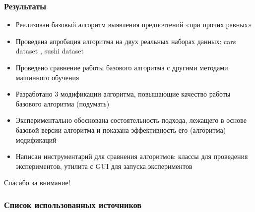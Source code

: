 \documentclass[xcolor=table]{beamer}
\theoremstyle{definition}
\begin{document}
	\begin{frame}
		\frametitle{Результаты}
		\begin{itemize}
			\item Реализован базовый алгоритм выявления предпочтений «при прочих равных»
			\item Проведена апробация алгоритма на двух реальных наборах данных: cars dataset \cite{dataset:Abbasnejad:2013}, sushi dataset \cite{Kamishima:2003} 
			\item Проведено сравнение работы базового алгоритма с другими методами машинного обучения
			\item Разработано 3 модификации алгоритма, повышающие качество работы базового алгоритма (подумать)
			\item Экспериментально обоснована состоятельность подхода, лежащего в основе базовой версии алгоритма и показана  эффективность его (алгоритма) модификаций
		\end{itemize}
		\pause
		\begin{itemize}
			\item {\color{gray} Написан инструментарий для сравнения алгоритмов: классы для проведения экспериментов, утилита с GUI для запуска экспериментов}
		\end{itemize}
	\end{frame}
		
	\begin{frame}[plain,c]
		\begin{center}
			\Huge Спасибо за внимание!
		\end{center}
	\end{frame}

	\begin{frame}[allowframebreaks]
		\frametitle{Список использованных источников}
		
		
	\end{frame}
	
\end{document}
